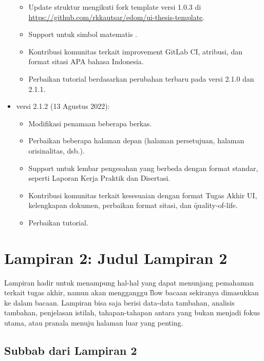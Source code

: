 \begin{itemize}
		\begin{itemize}
			\item Update struktur mengikuti fork template versi 1.0.3 di \url{https://github.com/rkkautsar/edom/ui-thesis-template}.
			\item Support untuk simbol matematis .
			\item Kontribusi komunitas terkait improvement GitLab CI, atribusi, dan format sitasi APA bahasa Indonesia.
			\item Perbaikan tutorial berdasarkan perubahan terbaru pada versi 2.1.0 dan 2.1.1.
		\end{itemize}
	\item versi 2.1.2 (13 Agustus 2022):
		\begin{itemize}
			\item Modifikasi penamaan beberapa berkas.
			\item Perbaikan beberapa halaman depan (halaman persetujuan, halaman orisinalitas, dsb.).
			\item Support untuk lembar pengesahan yang berbeda dengan format standar, seperti Laporan Kerja Praktik dan Disertasi.
			\item Kontribusi komunitas terkait kesesuaian dengan format Tugas Akhir UI, kelengkapan dokumen, perbaikan format sitasi, dan \f{quality-of-life}.
			\item Perbaikan tutorial.
		\end{itemize}
\end{itemize}

\chapter*{Lampiran 2: Judul Lampiran 2}
\label{appendix:sample}
Lampiran hadir untuk menampung hal-hal yang dapat menunjang pemahaman terkait tugas akhir, namun akan mengganggu \f{flow} bacaan sekiranya dimasukkan ke dalam bacaan.
Lampiran bisa saja berisi data-data tambahan, analisis tambahan, penjelasan istilah, tahapan-tahapan antara yang bukan menjadi fokus utama, atau pranala menuju halaman luar yang penting.

\section*{Subbab dari Lampiran 2}
\label{appendix:sampleSubchap}
